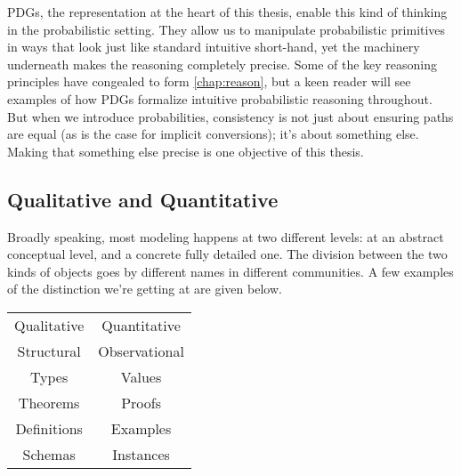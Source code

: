 PDGs, the representation at the heart of this thesis, enable this kind of thinking in the probabilistic setting.
They allow us to manipulate probabilistic primitives in ways that look just like standard intuitive short-hand, yet the machinery underneath makes the reasoning completely precise.
Some of the key reasoning principles have congealed to form \cref{chap:reason},
but a keen reader will see examples of how PDGs formalize intuitive probabilistic reasoning throughout. 
But when we introduce probabilities, consistency is not just about ensuring paths are equal 
    (as is the case for implicit conversions); it's about something else. 
Making that something else precise is one objective of this thesis. 
%


\subsection{Qualitative and Quantitative}

Broadly speaking, most modeling happens at two different levels: 
    at an abstract conceptual level, and a concrete fully detailed one.
The division between the two kinds of objects
    goes by different names in different communities. 
A few examples of the distinction we're getting at are given below.

\begin{center}
    \begin{tabular}{c|c}
        Qualitative & Quantitative \\ 
        Structural & Observational \\
            \hline
        Types & Values \\ 
        Theorems & Proofs \\
        Definitions & Examples \\
        Schemas & Instances 
    \end{tabular}
\end{center}

